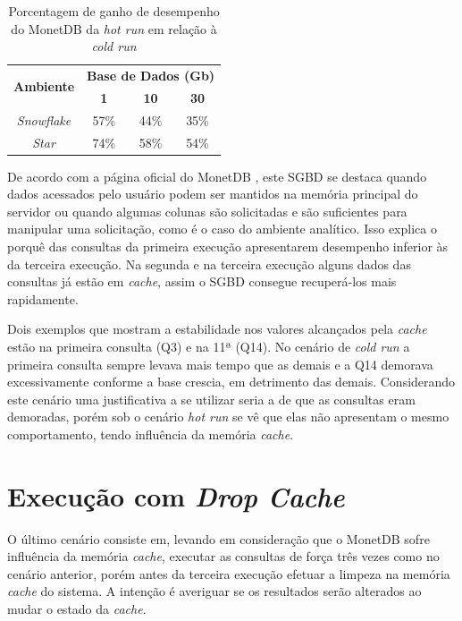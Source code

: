 \begin{table}[htpb]
        \centering
        \caption{Porcentagem de ganho de desempenho do MonetDB da \textit{hot run} em relação à \textit{cold run}}
        \label{tab:ganho_monet_cold_hot}
        \begin{tabular}{|c|c|c|c|}
        \hline
        \multirow{2}{*}{\textbf{Ambiente}} & \multicolumn{3}{c|}{\textbf{Base de Dados (Gb)}} \\ \cline{2-4} 
        & \textbf{1}     & \textbf{10}    & \textbf{30}    \\ \hline
        \textit{Snowflake}                 & 57\%           & 44\%           & 35\%           \\ \hline
        \textit{Star}                      & 74\%           & 58\%           & 54\%           \\ \hline
        \end{tabular}
\end{table}

De acordo com a página oficial do MonetDB \cite{monetdb2017c}, este SGBD se destaca quando dados acessados pelo usuário podem ser mantidos na memória principal do servidor ou quando algumas colunas são solicitadas e são suficientes para manipular uma solicitação, como é o caso do ambiente analítico. Isso explica o porquê das consultas da primeira execução apresentarem desempenho inferior às da terceira execução. Na segunda e na terceira execução alguns dados das consultas já estão em \textit{cache}, assim o SGBD consegue recuperá-los mais rapidamente.

Dois exemplos que mostram a estabilidade nos valores alcançados pela \textit{cache} estão na primeira consulta (Q3) e na 11ª (Q14). No cenário de \textit{cold run} a primeira consulta sempre levava mais tempo que as demais e a Q14 demorava excessivamente conforme a base crescia, em detrimento das demais. Considerando este cenário uma justificativa a se utilizar seria a de que as consultas eram demoradas, porém sob o cenário \textit{hot run} se vê que elas não apresentam o mesmo comportamento, tendo influência da memória \textit{cache}.

\section{Execução com \textit{Drop Cache}}

O último cenário consiste em, levando em consideração que o MonetDB sofre influência da memória \textit{cache}, executar as consultas de força três vezes como no cenário anterior, porém antes da terceira execução efetuar a limpeza na memória \textit{cache} do sistema. A intenção é averiguar se os resultados serão alterados ao mudar o estado da \textit{cache}.

